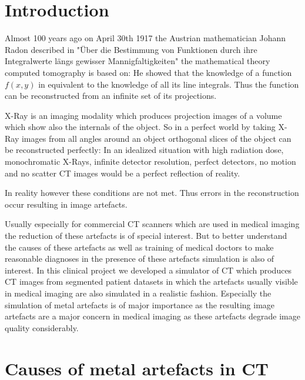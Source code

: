 \chapter{Introduction}
\label{intro}
\par Almost 100 years ago on April 30th 1917 the Austrian mathematician Johann Radon described in "\"Uber die Bestimmung von Funktionen durch ihre Integralwerte l\"angs gewisser Mannigfaltigkeiten" the mathematical theory computed tomography is based on: He showed that the knowledge of a function \(f(x,y)\) in equivalent to the knowledge of all its line integrals. Thus the function can be reconstructed from an infinite set of its projections.\cite{Radon}
\par X-Ray is an imaging modality which produces projection images of a volume which show also the internals of the object. So in a perfect world by taking X-Ray images from all angles around an object orthogonal slices of the object can be reconstructed perfectly: In an idealized situation with high radiation dose, monochromatic X-Rays, infinite detector resolution, perfect detectors, no motion and no scatter CT images would be a perfect reflection of reality.\cite{CausesAndReductionTechniques}
\par In reality however these conditions are not met. Thus errors in the reconstruction occur resulting in image artefacts.
\par Usually especially for commercial CT scanners which are used in medical imaging the reduction of these artefacts is of special interest. But to better understand the causes of these artefacts as well as training of medical doctors to make reasonable diagnoses in the presence of these artefacts simulation is also of interest. In this clinical project we developed a simulator of CT which produces CT images from segmented patient datasets in which the artefacts usually visible in medical imaging are also simulated in a realistic fashion. Especially the simulation of metal artefacts is of major importance as the resulting image artefacts are a major concern in medical imaging as these artefacts degrade image quality considerably.

\chapter{Causes of metal artefacts in CT}
